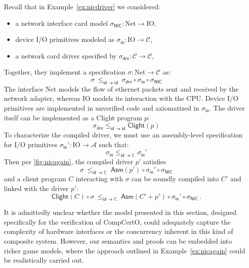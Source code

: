 \documentclass[sigplan,screen,review]{acmart}
\newcommand{\kw}[1]{\ensuremath{ \mathsf{#1} }}
\newcommand{\li}[1]{\mathrm{#1}}
\begin{document}
\begin{example} \label{ex:nicagain} %
  Recall that in Example~\ref{ex:nicdriver}
  we considered:
  \begin{itemize}
  \item a network interface card model
  $\sigma_\kw{NIC} : \li{Net} \rightarrow \li{IO}$,
  \item device I/O primitives modeled as
  $\sigma_\kw{io} : \li{IO} \rightarrow \mathcal{C}$,
  \item a network card driver specified by
  $\sigma_\kw{drv} : \mathcal{C} \rightarrow \mathcal{C}$,
  \end{itemize}
  Together, they implement a specification
  $\sigma : \li{Net} \rightarrow \mathcal{C}$ as:
  \begin{equation} \label{eqn:nicspec}
    \sigma
    \: \le_{\kw{id} \twoheadrightarrow \kw{id}} \:
    \sigma_\kw{drv} \circ \sigma_\kw{io} \circ \sigma_\kw{NIC}
  \end{equation}
  The interface $\li{Net}$ models the flow of ethernet packets
  sent and received by the network adapter,
  whereas $\li{IO}$ models its interaction with the CPU.
  Device I/O primitives are implemented in unverified code
  and axiomatized in $\sigma_\kw{io}$.
  The driver itself can be implemented as a Clight program $p$:
  \begin{equation} \label{eqn:drvcorrect}
    \sigma_\kw{drv}
    \le_{\kw{id} \twoheadrightarrow \kw{id}}
    \kw{Clight}(p)
  \end{equation}
  To characterize the compiled driver,
  we must use an assembly-level specification for I/O primitives
  $\sigma_\kw{io}' : \li{IO} \rightarrow \mathcal{A}$
  such that:
  \begin{equation} \label{eqn:iocompat}
    \sigma_\kw{io}
    \le_{\kw{id} \twoheadrightarrow \mathbb{C}}
    \sigma_\kw{io}'
  \end{equation}
  Then per \autoref{fig:nicagain},
  the compiled driver $p'$ satisfies
  \[
    \sigma
    \: \le_{\kw{id} \twoheadrightarrow \mathbb{C}} \:
    \kw{Asm}(p') \circ \sigma_\kw{io}' \circ \sigma_\kw{NIC}
  \]
  and a client program $C$ interacting with $\sigma$
  can be soundly compiled into $C'$ and linked with the driver $p'$:
  \[
    \kw{Clight}(C) \circ \sigma
    \: \le_{\kw{id} \twoheadrightarrow \mathbb{C}} \:
    \kw{Asm}(C' + p') \circ \sigma_\kw{io}' \circ \sigma_\kw{NIC}
    \,.
  \]
\end{example}

It is admittedly unclear whether
the model presented in this section,
designed specifically for the verification of CompCertO,
could adequately capture
the complexity of hardware interfaces
or the concurrency inherent in this kind of composite system.
However,
our semantics and proofs
can be embedded into richer game models,
where the approach outlined in Example~\ref{ex:nicagain}
could be realistically carried out.
\end{document}
